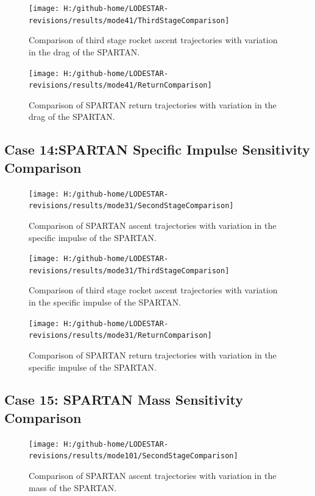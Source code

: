 \begin{figure}[!th]
\centering
\texttt{[image: H:/github-home/LODESTAR-revisions/results/mode41/ThirdStageComparison]}
\caption{Comparison of third stage rocket ascent trajectories with variation in the drag of the SPARTAN.}
\label{fig:ThirdStageComparison11}
\end{figure}

\begin{figure}[!th]
\centering
\texttt{[image: H:/github-home/LODESTAR-revisions/results/mode41/ReturnComparison]}
\caption{Comparison of SPARTAN return trajectories with variation in the drag of the SPARTAN.}
\label{fig:ReturnComparison11}
\end{figure}

\FloatBarrier
\clearpage
\subsection{Case 14:SPARTAN Specific Impulse Sensitivity Comparison}\label{sec:app_comparison31}
\begin{figure}[!th]
	\centering
	\texttt{[image: H:/github-home/LODESTAR-revisions/results/mode31/SecondStageComparison]}
	\caption{Comparison of SPARTAN ascent trajectories with variation in the specific impulse of the SPARTAN.}
	\label{fig:SecondStageComparison10}
\end{figure}

\begin{figure}[!th]
	\centering
	\texttt{[image: H:/github-home/LODESTAR-revisions/results/mode31/ThirdStageComparison]}
	\caption{Comparison of third stage rocket ascent trajectories with variation in the specific impulse of the SPARTAN.}
	\label{fig:ThirdStageComparison10}
\end{figure}

\begin{figure}[!th]
	\centering
	\texttt{[image: H:/github-home/LODESTAR-revisions/results/mode31/ReturnComparison]}
	\caption{Comparison of SPARTAN return trajectories with variation in the specific impulse of the SPARTAN.}
	\label{fig:ReturnComparison10}
\end{figure}
\FloatBarrier
\clearpage
\subsection{Case 15: SPARTAN Mass Sensitivity Comparison}\label{sec:app_comparison101}

\begin{figure}[!th]
\centering
\texttt{[image: H:/github-home/LODESTAR-revisions/results/mode101/SecondStageComparison]}
\caption{Comparison of SPARTAN ascent trajectories with variation in the mass of the SPARTAN.}
\label{fig:SecondStageComparison12}
\end{figure}

